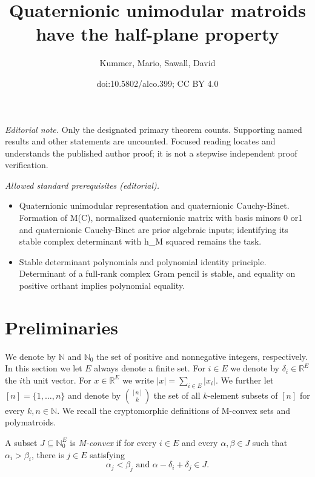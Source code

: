 \documentclass[11pt]{article}
\title{Quaternionic unimodular matroids have the half-plane property}
\author{Kummer, Mario, Sawall, David}
\date{doi:10.5802/alco.399; CC BY 4.0}
\theoremstyle{definition}
\numberwithin{equation}{section}
\newcommand{\N}{{\mathbb N}}
\newcommand{\R}{{\mathbb R}}
\begin{document}
\maketitle
\noindent\textit{Editorial note.} Only the designated primary theorem counts. Supporting named results and other statements are uncounted. Focused reading locates and understands the published author proof; it is not a stepwise independent proof verification.\par\medskip
\noindent\textit{Allowed standard prerequisites (editorial).}\begin{itemize}
\item Quaternionic unimodular representation and quaternionic Cauchy-Binet. Formation of M(C), normalized quaternionic matrix with basis minors 0 or1 and quaternionic Cauchy-Binet are prior algebraic inputs; identifying its stable complex determinant with h\_M squared remains the task.
\item Stable determinant polynomials and polynomial identity principle. Determinant of a full-rank complex Gram pencil is stable, and equality on positive orthant implies polynomial equality.
\end{itemize}\medskip
\section{Preliminaries}
We denote by $\N$ and $\N_0$ the set of positive and nonnegative integers, respectively.
In this section we let $E$ always denote a finite set. For $i\in E$ we denote by $\delta_i\in\R^E$ the $i$th unit vector. For $x\in\R^E$ we write $|x|=\sum_{i\in E}|x_i|$. We further let $[n]=\{1,\ldots,n\}$ and denote by $\binom{[n]}{k}$ the set of all $k$-element subsets of $[n]$ for every $k,n\in\N$. We recall the cryptomorphic definitions of M-convex sets and polymatroids.

\begin{Def}
     A subset $J\subseteq\N_0^E$ is \emph{M-convex} if for every $i\in E$ and every $\alpha,\beta\in J$ such that $\alpha_i>\beta_i$, there is $j\in E$ satisfying
            \begin{equation*}
                \alpha_j<\beta_j\textrm{ and }\alpha-\delta_i+\delta_j\in J.
            \end{equation*}
\end{Def}
\end{document}
